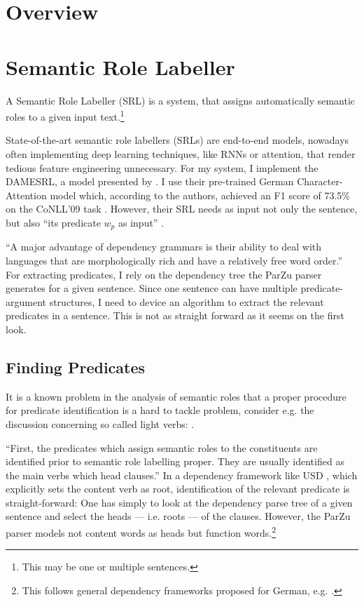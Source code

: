 
\label{chap:4_architecture}

\section{Overview}

\section{Semantic Role Labeller}

A Semantic Role Labeller (SRL) is a system, that assigns automatically semantic roles to a given input text.\footnote{This may be one or multiple sentences.}

State-of-the-art semantic role labellers (SRLs) are end-to-end models, nowadays often implementing deep learning techniques, like RNNs or attention, that render tedious feature engineering unnecessary.
For my system, I implement the DAMESRL, a model presented by \cite{do2018flexible}.
I use their pre-trained German Character-Attention model which, according to the authors, achieved an F1 score of 73.5\% on the CoNLL'09 task \citep{hajivc2009conll}.
However, their SRL needs as input not only the sentence, but also ``its predicate $w_p$ as input'' \citep{do2018flexible}.

``A major advantage of dependency grammars is their ability to deal with languages that are morphologically rich and have a relatively free word order.'' \citep[p.~274]{jurafsky2019speech}
For extracting predicates, I rely on the dependency tree the ParZu parser \cite{sennrich2013exploiting} generates for a given sentence.
Since one sentence can have multiple predicate-argument structures, I need to device an algorithm to extract the relevant predicates in a sentence.
This is not as straight forward as it seems on the first look.

\subsection{Finding Predicates}

It is a known problem in the analysis of semantic roles that a proper procedure for predicate identification is a hard to tackle problem, consider e.g. the discussion concerning so called light verbs: \cite{wittenberg2016light}.

``First, the predicates which assign semantic roles to the constituents are identified prior to semantic role labelling proper. They are usually identified as the main verbs which head clauses.'' \citep[p.~74]{samardzic2013dynamics}
In a dependency framework like USD \citep{de2014universal}, which explicitly sets the content verb as root, identification of the relevant predicate is straight-forward:
One has simply to look at the dependency parse tree of a given sentence and select the heads --- i.e. roots --- of the clauses.
However, the ParZu parser models not content words as heads but function words.\footnote{This follows general dependency frameworks proposed for German, e.g. \cite{gerdes2001word, gross2015dependency}.}

